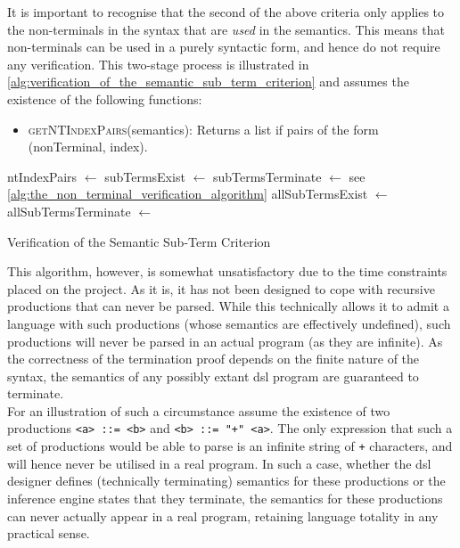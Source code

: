 It is important to recognise that the second of the above criteria only applies to the non-terminals in the syntax that are \textit{used} in the semantics.
This means that non-terminals can be used in a purely syntactic form, and hence do not require any verification.
This two-stage process is illustrated in \autoref{alg:verification_of_the_semantic_sub_term_criterion} and assumes the existence of the following functions:
\begin{itemize}
    \item \textsc{getNTIndexPairs}(semantics): Returns a list if pairs of the form (nonTerminal, index).
\end{itemize}

\begin{algorithm}[!htb]
\begin{algorithmic}
    \State ntIndexPairs $\gets$ 
    \State subTermsExist $\gets$ 
    \State subTermsTerminate $\gets$ 
    \LineComment see \autoref{alg:the_non_terminal_verification_algorithm}
    \State allSubTermsExist $\gets$ 
    \State allSubTermsTerminate $\gets$ 
        \State {}
    \Else
        \State {}
    \EndIf
\EndFunction
\end{algorithmic}
\caption{Verification of the Semantic Sub-Term Criterion}
\label{alg:verification_of_the_semantic_sub_term_criterion}
\end{algorithm}

This algorithm, however, is somewhat unsatisfactory due to the time constraints placed on the project. 
As it is, it has not been designed to cope with recursive productions that can never be parsed. 
While this technically allows it to admit a language with such productions (whose semantics are effectively undefined), such productions will never be parsed in an actual program (as they are infinite).
As the correctness of the termination proof depends on the finite nature of the syntax, the semantics of any possibly extant \gls{dsl} program are guaranteed to terminate.\\

For an illustration of such a circumstance assume the existence of two productions \texttt{<a> ::= <b>} and \texttt{<b> ::= "+" <a>}. 
The only expression that such a set of productions would be able to parse is an infinite string of \texttt{+} characters, and will hence never be utilised in a real program.
In such a case, whether the \gls{dsl} designer defines (technically terminating) semantics for these productions or the inference engine states that they terminate, the semantics for these productions can never actually appear in a real program, retaining language totality in any practical sense. 

